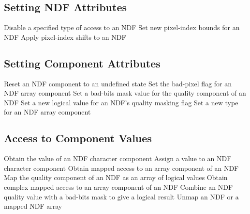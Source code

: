 \subsection{Setting NDF Attributes}

            {Disable a specified type of access to an NDF}
            {Set new pixel-index bounds for an NDF}
            {Apply pixel-index shifts to an NDF}

\subsection{Setting Component Attributes}

            {Reset an NDF component to an undefined state}
            {Set the bad-pixel flag for an NDF array component}
            {Set a bad-bits mask value for the quality component of an NDF}
            {Set a new logical value for an NDF's quality masking flag}
            {Set a new type for an NDF array component}

\subsection{Access to Component Values}

            {Obtain the value of an NDF character component}
            {Assign a value to an NDF character component}
            {Obtain mapped access to an array component of an NDF}
            {Map the quality component of an NDF as an array of logical values}
            {Obtain complex mapped access to an array component of an NDF}
            {Combine an NDF quality value with a bad-bits mask to give a logical result}
            {Unmap an NDF or a mapped NDF array}

